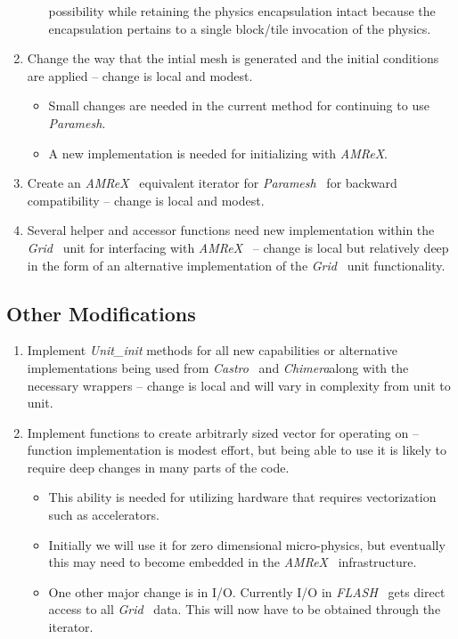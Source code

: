 \documentclass{article}
\newcommand{\flash}{{\it FLASH}}
\newcommand{\amrex}{{\it AMReX}}
\newcommand{\paramesh}{{\it Paramesh}}
\newcommand{\castro}{{\it Castro}}
\newcommand{\chimera}{{\it Chimera}}
\newcommand{\grid}{{\it Grid}}
\begin{document}
\begin{enumerate}
\begin{itemize}
possibility while retaining the physics encapsulation intact because
the encapsulation pertains to a single block/tile invocation of the physics.
\end{itemize}
\item Change the way that the intial mesh is generated and the initial
conditions are applied -- change is local and modest.
\begin{itemize}
\item Small changes are needed in the current method for continuing
to use \paramesh.
\item A new implementation is needed for initializing with \amrex.
\end{itemize}
\item Create an \amrex~ equivalent iterator for \paramesh~ for backward
compatibility -- change is local and modest.
\item Several helper and accessor functions need new implementation within the
\grid~ unit for interfacing with \amrex~ -- change is local but
relatively deep in the form of an alternative implementation of the \grid~ unit functionality.
\end{enumerate}

\subsection{Other Modifications}
\label{sec:other}
\begin{enumerate}
\item Implement {\it Unit\_init} methods for all new capabilities or
alternative implementations being used from \castro~ and \chimera along
with the necessary wrappers -- change is local and will vary in
complexity from unit to unit.
\item Implement functions to create arbitrarly sized vector for
operating on -- function implementation is modest effort, but being
able to use it is likely to require deep changes in many parts of the
code.
\begin{itemize}
\item This ability is needed for utilizing hardware that requires
vectorization such as accelerators.
\item Initially we will use it for zero dimensional micro-physics, but
eventually this may need to become embedded in the \amrex~
infrastructure.
\item One other major change is in I/O. Currently I/O in \flash~ gets
direct access to all \grid~ data. This will now have to be obtained
through the iterator.
\end{itemize}
\end{enumerate}
\end{document}
